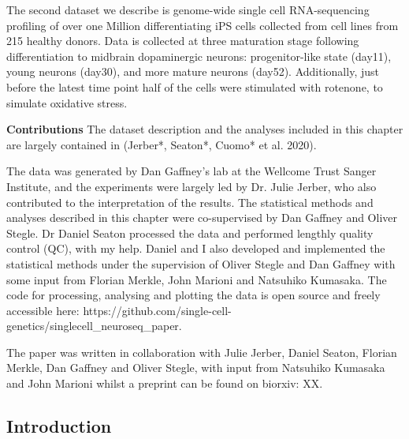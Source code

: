 The second dataset we describe is genome-wide single cell RNA-sequencing profiling of over one Million differentiating iPS cells collected from cell lines from 215 healthy donors. 
Data is collected at three maturation stage following differentiation to midbrain dopaminergic neurons: progenitor-like state (day11), young neurons (day30), and more mature neurons (day52). 
Additionally, just before the latest time point half of the cells were stimulated with rotenone, to simulate oxidative stress. 

\vspace{5mm}

\begin{Abstract}

\hspace{-3mm}\textbf{Contributions} The dataset description and the analyses included in this chapter are largely contained in (Jerber*, Seaton*, Cuomo* et al. 2020).

\vspace{5mm}

The data was generated by Dan Gaffney’s lab at the Wellcome Trust Sanger Institute, and the experiments were largely led by Dr. Julie Jerber, who also contributed to the interpretation of the results. 
The statistical methods and analyses described in this chapter were co-supervised by Dan Gaffney and Oliver Stegle. 
Dr Daniel Seaton processed the data and performed lengthly quality control (QC), with my help. 
Daniel and I also developed and implemented the statistical methods under the supervision of Oliver Stegle and Dan Gaffney with some input from Florian Merkle, John Marioni and Natsuhiko Kumasaka.
The code for processing, analysing and plotting the data is open source and freely accessible here: https://github.com/single-cell-genetics/singlecell\_neuroseq\_paper.

\vspace{5mm}

The paper was written in collaboration with Julie Jerber, Daniel Seaton, Florian Merkle, Dan Gaffney and Oliver Stegle, with input from Natsuhiko Kumasaka and John Marioni whilst a preprint can be found on biorxiv: XX.

\end{Abstract}

\subsection{Introduction}

